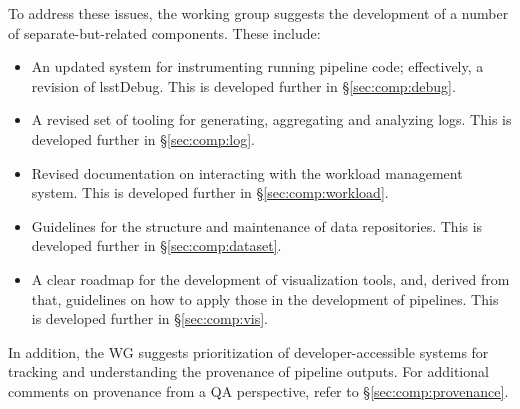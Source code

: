 \begin{itemize}
\end{itemize}

To address these issues, the working group suggests the development of a
number of separate-but-related components. These include:

\begin{itemize}

  \item{An updated system for instrumenting running pipeline code;
  effectively, a revision of lsstDebug. This is developed further in
  \S\ref{sec:comp:debug}.}

  \item{A revised set of tooling for generating, aggregating and analyzing
  logs. This is developed further in \S\ref{sec:comp:log}.}

  \item{Revised documentation on interacting with the workload management
  system. This is developed further in \S\ref{sec:comp:workload}.}

  \item{Guidelines for the structure and maintenance of data repositories.
  This is developed further in \S\ref{sec:comp:dataset}.}

  \item{A clear roadmap for the development of visualization tools, and,
  derived from that, guidelines on how to apply those in the development of
  pipelines. This is developed further in \S\ref{sec:comp:vis}.}

\end{itemize}

In addition, the WG suggests prioritization of developer-accessible
systems for tracking and understanding the \gls{provenance} of pipeline
outputs. For additional comments on provenance from a QA perspective, refer to
\S\ref{sec:comp:provenance}.

